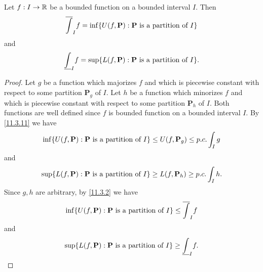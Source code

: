 \begin{prop}\label{11.3.12}
  Let \(f : I \to \mathbb{R}\) be a bounded function on a bounded interval \(I\).
  Then
  \[
    \overline{\int}_I f = \inf\set{U(f, \mathbf{P}) : \mathbf{P} \text{ is a partition of } I}
  \]
  and
  \[
    \underline{\int}_I f = \sup\set{L(f, \mathbf{P}) : \mathbf{P} \text{ is a partition of } I}.
  \]
\end{prop}

\begin{proof}
  Let \(g\) be a function which majorizes \(f\) and which is piecewise constant with respect to some partition \(\mathbf{P}_g\) of \(I\).
  Let \(h\) be a function which minorizes \(f\) and which is piecewise constant with respect to some partition \(\mathbf{P}_h\) of \(I\).
  Both functions are well defined since \(f\) is bounded function on a bounded interval \(I\).
  By \cref{11.3.11} we have
  \[
    \inf\set{U(f, \mathbf{P}) : \mathbf{P} \text{ is a partition of } I} \leq U(f, \mathbf{P}_g) \leq p.c. \int_I g
  \]
  and
  \[
    \sup\set{L(f, \mathbf{P}) : \mathbf{P} \text{ is a partition of } I} \geq L(f, \mathbf{P}_h) \geq p.c. \int_I h.
  \]
  Since \(g, h\) are arbitrary, by \cref{11.3.2} we have
  \[
    \inf\set{U(f, \mathbf{P}) : \mathbf{P} \text{ is a partition of } I} \leq \overline{\int}_I f
  \]
  and
  \[
    \sup\set{L(f, \mathbf{P}) : \mathbf{P} \text{ is a partition of } I} \geq \underline{\int}_I f.
  \]


\end{proof}
